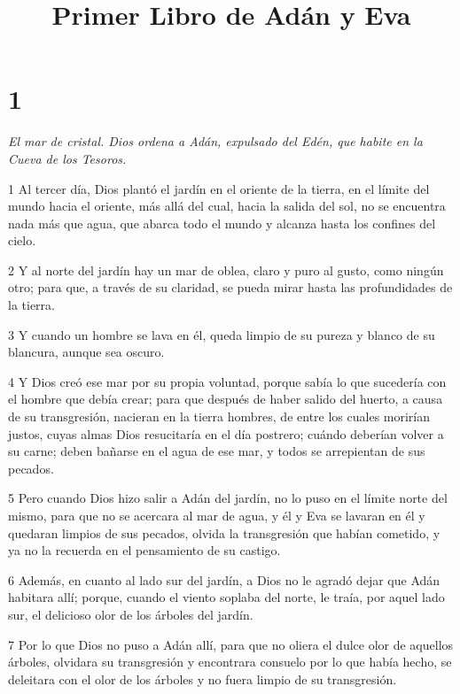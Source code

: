 

\title{Primer Libro de Adán y Eva}

\chapter{1}

\par \textit{El mar de cristal. Dios ordena a Adán, expulsado del Edén, que habite en la Cueva de los Tesoros.}

\par 1 Al tercer día, Dios plantó el jardín en el oriente de la tierra, en el límite del mundo hacia el oriente, más allá del cual, hacia la salida del sol, no se encuentra nada más que agua, que abarca todo el mundo y alcanza hasta los confines del cielo.

\par 2 Y al norte del jardín hay un mar de oblea, claro y puro al gusto, como ningún otro; para que, a través de su claridad, se pueda mirar hasta las profundidades de la tierra.

\par 3 Y cuando un hombre se lava en él, queda limpio de su pureza y blanco de su blancura, aunque sea oscuro.

\par 4 Y Dios creó ese mar por su propia voluntad, porque sabía lo que sucedería con el hombre que debía crear; para que después de haber salido del huerto, a causa de su transgresión, nacieran en la tierra hombres, de entre los cuales morirían justos, cuyas almas Dios resucitaría en el día postrero; cuándo deberían volver a su carne; deben bañarse en el agua de ese mar, y todos se arrepientan de sus pecados.

\par 5 Pero cuando Dios hizo salir a Adán del jardín, no lo puso en el límite norte del mismo, para que no se acercara al mar de agua, y él y Eva se lavaran en él y quedaran limpios de sus pecados, olvida la transgresión que habían cometido, y ya no la recuerda en el pensamiento de su castigo.

\par 6 Además, en cuanto al lado sur del jardín, a Dios no le agradó dejar que Adán habitara allí; porque, cuando el viento soplaba del norte, le traía, por aquel lado sur, el delicioso olor de los árboles del jardín.

\par 7 Por lo que Dios no puso a Adán allí, para que no oliera el dulce olor de aquellos árboles, olvidara su transgresión y encontrara consuelo por lo que había hecho, se deleitara con el olor de los árboles y no fuera limpio de su transgresión.

